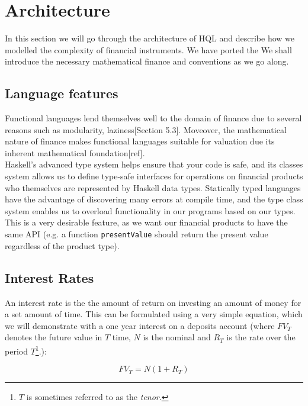 \chapter{Architecture}

In this section we will go through the architecture of HQL and describe how we 
modelled the complexity of financial instruments. We have ported the 
We shall introduce the necessary mathematical finance and conventions as we go 
along.

\section{Language features}

Functional languages lend themselves well to the domain of finance due
to several reasons such as modularity\cite{hughes:matters-cj}, 
laziness\cite{composingcontracts}[Section 5.3]. Moveover, the mathematical
 nature of finance makes functional languages suitable for valuation due its
inherent mathematical foundation[ref].\\

Haskell’s advanced type system helps ensure that your code is safe, and its 
classes system allows us to define type-safe interfaces for operations on 
financial products who themselves are represented by Haskell data types. 
Statically typed languages have the advantage of discovering many errors at 
compile time, and the type class system enables us to overload functionality in 
our programs based on our types. This is a very desirable feature, as we want 
our financial products to have the same API (e.g. a function 
\texttt{presentValue} should return the present value regardless of the product 
type).\\

\section{Interest Rates}

An interest rate is the the amount of return on investing an amount of money 
for a set amount of time. This can be formulated using a very simple equation, 
which we will demonstrate with a one year interest on a deposits account (where
$FV_T$ denotes the future value in $T$ time, $N$ is the nominal and $R_T$ is the
rate over the period $T$\footnote{$T$ is sometimes referred to as the
\emph{tenor}.}.):

\begin{equation}
FV_T = N (1 + R_T)
\end{equation}

